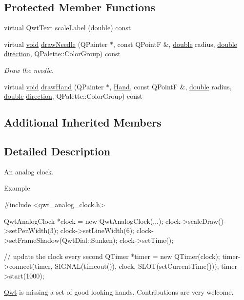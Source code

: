 \subsection*{Protected Member Functions}
\begin{DoxyCompactItemize}
\item 
virtual \hyperlink{class_qwt_text}{Qwt\-Text} \hyperlink{class_qwt_analog_clock_ac41f420214578dfebbd8a6216105e510}{scale\-Label} (\hyperlink{_super_l_u_support_8h_a8956b2b9f49bf918deed98379d159ca7}{double}) const 
\item 
virtual \hyperlink{group___u_a_v_objects_plugin_ga444cf2ff3f0ecbe028adce838d373f5c}{void} \hyperlink{class_qwt_analog_clock_ac243e3acb6ba8edd73c24918e170f529}{draw\-Needle} (Q\-Painter $\ast$, const Q\-Point\-F \&, \hyperlink{_super_l_u_support_8h_a8956b2b9f49bf918deed98379d159ca7}{double} radius, \hyperlink{_super_l_u_support_8h_a8956b2b9f49bf918deed98379d159ca7}{double} \hyperlink{class_qwt_dial_a7502d5cebc37d6a7160b74a6f67dfe55}{direction}, Q\-Palette\-::\-Color\-Group) const 
\begin{DoxyCompactList}\small\item\em Draw the needle. \end{DoxyCompactList}\item 
virtual \hyperlink{group___u_a_v_objects_plugin_ga444cf2ff3f0ecbe028adce838d373f5c}{void} \hyperlink{class_qwt_analog_clock_a62cbacb57c60c7584ba30f340ed575a1}{draw\-Hand} (Q\-Painter $\ast$, \hyperlink{class_qwt_analog_clock_acd8f7e963ae073120684de46821f2cfe}{Hand}, const Q\-Point\-F \&, \hyperlink{_super_l_u_support_8h_a8956b2b9f49bf918deed98379d159ca7}{double} radius, \hyperlink{_super_l_u_support_8h_a8956b2b9f49bf918deed98379d159ca7}{double} \hyperlink{class_qwt_dial_a7502d5cebc37d6a7160b74a6f67dfe55}{direction}, Q\-Palette\-::\-Color\-Group) const 
\end{DoxyCompactItemize}
\subsection*{Additional Inherited Members}


\subsection{Detailed Description}
An analog clock. 



\begin{DoxyParagraph}{Example}
\begin{DoxyVerb}#include <qwt_analog_clock.h>

QwtAnalogClock *clock = new QwtAnalogClock(...);
clock->scaleDraw()->setPenWidth(3);
clock->setLineWidth(6);
clock->setFrameShadow(QwtDial::Sunken);
clock->setTime();

// update the clock every second
QTimer *timer = new QTimer(clock);
timer->connect(timer, SIGNAL(timeout()), clock, SLOT(setCurrentTime()));
timer->start(1000);\end{DoxyVerb}

\end{DoxyParagraph}
\hyperlink{namespace_qwt}{Qwt} is missing a set of good looking hands. Contributions are very welcome.

